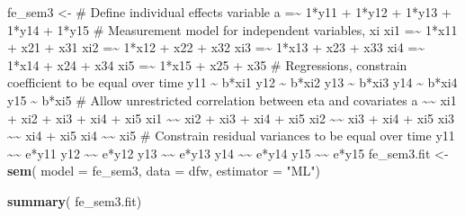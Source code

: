 \documentclass[]{interact}
\theoremstyle{plain}%
\theoremstyle{definition}
\theoremstyle{remark}
\newenvironment{Shaded}{\begin{snugshade}}{\end{snugshade}}
\newcommand{\DataTypeTok}[1]{\textcolor[rgb]{0.13,0.29,0.53}{#1}}
\newcommand{\KeywordTok}[1]{\textcolor[rgb]{0.13,0.29,0.53}{\textbf{#1}}}
\newcommand{\NormalTok}[1]{#1}
\newcommand{\StringTok}[1]{\textcolor[rgb]{0.31,0.60,0.02}{#1}}
\begin{document}
\singlespacing

\begin{Shaded}
\begin{Highlighting}[]
\NormalTok{fe\_sem3 \textless{}{-}}\StringTok{ \textquotesingle{}}
\StringTok{\# Define individual effects variable }
\StringTok{a =\textasciitilde{} 1*y11 + 1*y12 + 1*y13 + 1*y14 + 1*y15}
\StringTok{\# Measurement model for independent variables, xi }
\StringTok{xi1 =\textasciitilde{} 1*x11 + x21 + x31 }
\StringTok{xi2 =\textasciitilde{} 1*x12 + x22 + x32}
\StringTok{xi3 =\textasciitilde{} 1*x13 + x23 + x33}
\StringTok{xi4 =\textasciitilde{} 1*x14 + x24 + x34}
\StringTok{xi5 =\textasciitilde{} 1*x15 + x25 + x35}
\StringTok{\# Regressions, constrain coefficient to be equal over time}
\StringTok{y11 \textasciitilde{} b*xi1}
\StringTok{y12 \textasciitilde{} b*xi2 }
\StringTok{y13 \textasciitilde{} b*xi3}
\StringTok{y14 \textasciitilde{} b*xi4}
\StringTok{y15 \textasciitilde{} b*xi5}
\StringTok{\# Allow unrestricted correlation between eta and covariates}
\StringTok{a \textasciitilde{}\textasciitilde{} xi1 + xi2 + xi3 + xi4 + xi5}
\StringTok{xi1 \textasciitilde{}\textasciitilde{} xi2 + xi3 + xi4 + xi5}
\StringTok{xi2 \textasciitilde{}\textasciitilde{} xi3 + xi4 + xi5}
\StringTok{xi3 \textasciitilde{}\textasciitilde{} xi4 + xi5}
\StringTok{xi4 \textasciitilde{}\textasciitilde{} xi5}
\StringTok{\# Constrain residual variances to be equal over time}
\StringTok{y11 \textasciitilde{}\textasciitilde{} e*y11}
\StringTok{y12 \textasciitilde{}\textasciitilde{} e*y12}
\StringTok{y13 \textasciitilde{}\textasciitilde{} e*y13}
\StringTok{y14 \textasciitilde{}\textasciitilde{} e*y14}
\StringTok{y15 \textasciitilde{}\textasciitilde{} e*y15}
\StringTok{\textquotesingle{}}
\NormalTok{fe\_sem3.fit \textless{}{-}}\StringTok{ }\KeywordTok{sem}\NormalTok{( }\DataTypeTok{model =}\NormalTok{ fe\_sem3, }
                    \DataTypeTok{data =}\NormalTok{ dfw, }
                    \DataTypeTok{estimator =} \StringTok{"ML"}\NormalTok{)}
\end{Highlighting}
\end{Shaded}

\doublespacing

\singlespacing

\begin{Shaded}
\begin{Highlighting}[]
\KeywordTok{summary}\NormalTok{( fe\_sem3.fit)}
\end{Highlighting}
\end{Shaded}
\end{document}
